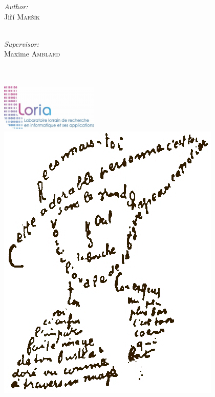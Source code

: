 \documentclass{report}
\begin{document}
\begin{titlepage}
\begin{center}
\begin{minipage}{0.4\textwidth}
\begin{flushleft} \large
\emph{Author:}\\
Ji\v{r}\'{i} \textsc{Mar\v{s}\'{i}k}\\
~
\end{flushleft}
\end{minipage}
\begin{minipage}{0.4\textwidth}
\begin{flushright} \large
\emph{Supervisor:} \\
Maxime \textsc{Amblard} \\
~
\end{flushright}
\end{minipage}
~\\[0.6cm]
\includegraphics[width=0.35\textwidth]{images/logoLORIA.jpg}~~~~~~~~~~~~~~~~~~~~~~~~~~~~~~~~~~~~~~~~~~~~~~\includegraphics[height=0.10\textheight]{images/Calligramme.png}

\end{center}
\end{titlepage}


\end{document}
